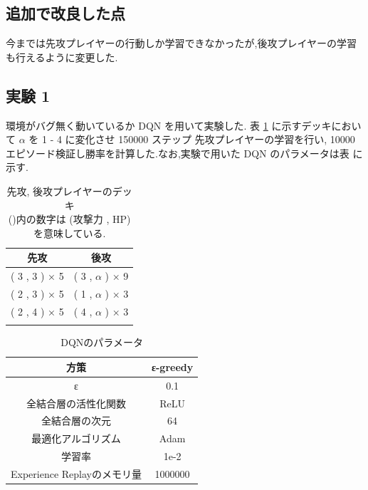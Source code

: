 \documentclass{jarticle}     %
\begin{document}
\subsection{追加で改良した点}
今までは先攻プレイヤーの行動しか学習できなかったが,後攻プレイヤーの学習も行えるように変更した.

\subsection{実験 1 }
環境がバグ無く動いているか DQN を用いて実験した.
表 \ref{table:deckjikken1} に示すデッキにおいて $\alpha$ を 1 - 4 に変化させ 150000 ステップ 先攻プレイヤーの学習を行い, 10000 エピソード検証し勝率を計算した.なお,実験で用いた DQN のパラメータは表 に示す.

\begin{table}[h]
  \centering
  \caption{先攻, 後攻プレイヤーのデッキ\\
  ()内の数字は (攻撃力 , HP) を意味している.}
  \begin{tabular}{ll}
  \multicolumn{1}{c}{先攻} & \multicolumn{1}{c}{後攻} \\
  \hline
  ( 3 , 3 ) × 5          & ( 3 , $\alpha$ )  × 9         \\
  ( 2 , 3 ) × 5          & ( 1 , $\alpha$ ) × 3          \\
  ( 2 , 4 ) × 5          & ( 4 , $\alpha$ ) × 3          \\
  \hline
  \label{table:deckjikken1}
  \end{tabular}
\end{table}

\begin{table}[h]
  \centering
  \caption{DQNのパラメータ}
  \label{table:param}
  \begin{tabular}{|c||c|}
  \hline
  方策                 & ε-greedy \\ \hline
  ε                      & 0.1      \\ \hline
  全結合層の活性化関数             & ReLU     \\ \hline
  全結合層の次元                & 64       \\ \hline
  最適化アルゴリズム              & Adam     \\ \hline
  学習率                    & 1e-2     \\ \hline
  Experience Replayのメモリ量 & 1000000  \\ \hline
  \end{tabular}
  \end{table}
\end{document}

